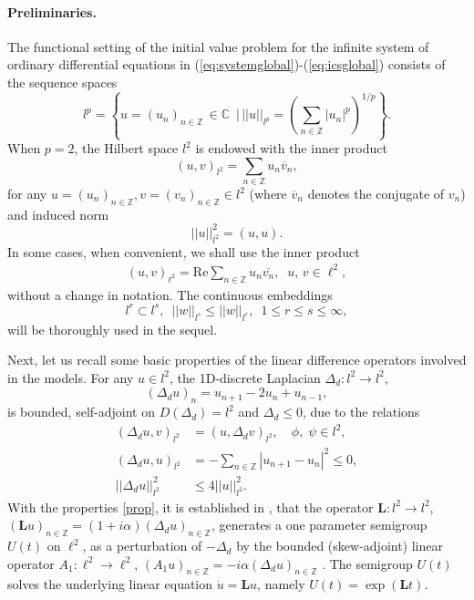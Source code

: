 \documentclass[preprintnumbers,amsmath,amssymb]{revtex4}
\begin{document}
\paragraph{Preliminaries.}
\label{parpre}
The functional setting of the initial value problem for the infinite system of ordinary differential equations in (\ref{eq:systemglobal})-(\ref{eq:icsglobal}) consists of the sequence spaces 
\begin{equation}
l^p=\left\{ u=(u_n)_{n \in {\mathbb{Z}}}\,\in {\mathbb{C}}\,\,\,\vert \, || u||_{l^p}=\left(\sum_{n \in {\mathbb{Z}}}|u_n|^p\right)^{1/p}\right\}.
\end{equation}
When $p=2$, the Hilbert space $l^2$ is endowed with the inner product  
\begin{equation}
(u,v)_{l^2}=\sum_{n \in {\mathbb{Z}}}u_n \overline{v}_n,
\end{equation}
for any $u=(u_n)_{n \in {\mathbb{Z}}},v=(v_n)_{n \in {\mathbb{Z}}}\in l^2$  (where $\overline{v}_n$ denotes the conjugate of 
$v_n$) and induced norm
\begin{equation}
|| u||_{l^2}^2=(u,u).
\end{equation}
In some cases, when convenient, we shall use the inner product 
\begin{eqnarray*}
	(u,v)_{\ell^2}=\mathrm{Re}\sum_{{n\in\mathbb{Z}}}u_n\overline{v_n},\;\;u,\,v\in\ell^2,
\end{eqnarray*}
without a change in notation.  The continuous embeddings
\begin{equation}
l^r\subset l^s,\,\,\,|| w||_{l^s}\le || 
w||_{l^r},\,\,\,1 \le r\le s \le \infty,\label{eq:embeddings}
\end{equation}
will be thoroughly used in the sequel.

Next, let us recall some basic properties of the linear difference operators involved in the models. For any $u \in l^2$, the 1D-discrete Laplacian $\Delta_d:l^2\rightarrow l^2$,
\begin{equation}
(\Delta_d u)_{n }=u_{n+1}-2u_n+u_{n-1},
\end{equation}
is bounded, self-adjoint on $D(\Delta_d)=l^2$ and $\Delta_d\le 0$, due to the relations
\begin{equation}
\begin{split}
\label{prop}
(\Delta_{d} u,v)_{l^2}&=(u,\Delta_{d}v)_{l^2}, \quad \phi,\;\psi\in l^2,\\
(\Delta_{d}u,u)_{l^2}&=-\sum_{n\in\mathbb{Z}}|u_{n+1}-u_n|^2\leq 0,\\
||\Delta_d u||_{l^2}^2&\leq 4||u||_{l^2}^2.
\end{split}
\end{equation}
With the properties \eqref{prop}, it is established in \cite[Lemma 2.2, pg. 715]{NAE2007}, that the operator $\mathbf{L}:l^2\rightarrow l^2$, $(\mathbf{L}u)_{n\in\mathbb{Z}}=(1+i\alpha)(\Delta_d u)_{n\in\mathbb{Z}}$, generates a one parameter semigroup  $U(t)$ on $\ell^2$, as a perturbation of $-\Delta_d$ by the bounded (skew-adjoint) linear operator $A_1:\ell^2\rightarrow\ell^2$,  $(A_1u)_{n\in\mathbb{Z}}=-i\alpha(\Delta_d u)_{n\in\mathbb{Z}}$ \cite{Pazy83}. The semigroup $U(t)$  solves the underlying linear equation $\dot{u}=\mathbf{L}u$, namely $U(t)=\exp(\mathbf{L}t)$.
\end{document}
